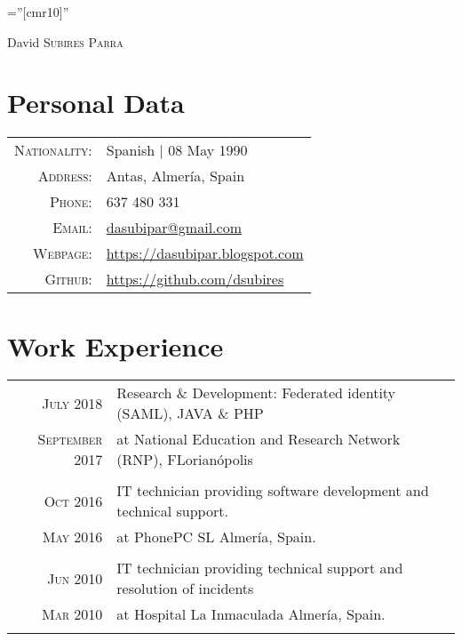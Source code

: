 \documentclass[a4paper,10pt]{article}
\begin{document}
\pagestyle{empty} %

\font\fb=''[cmr10]'' %

\par{\centering
		{\Huge David \textsc{Subires Parra}
	}\bigskip\par}

\section*{Personal Data}

\begin{tabular}{rp{12cm}}
    \textsc{Nationality:} & Spanish | 08 May 1990 \\
    \textsc{Address:}     & Antas, Almería, Spain \\
    \textsc{Phone:}       & 637 480 331 \\
    \textsc{Email:}       & \href {mailto:dasubipar@gmail.com}{dasubipar@gmail.com} \\
  \textsc{Webpage:}     & \url {https://dasubipar.blogspot.com} \\
    \textsc{Github:}      & \url{https://github.com/dsubires}
\end{tabular}

\section*{Work Experience}
\begin{tabular}{r|p{11cm}}


\textsc{July 2018} & Research \& Development: Federated identity (SAML), JAVA \& PHP
\\\textsc{September 2017} &  at National Education and Research Network (RNP), FLorianópolis  \normalsize \\\multicolumn{2}{c}{} \\



\textsc{Oct} 2016 & IT technician providing software development and technical support.\\\textsc{May 2016} & at PhonePC SL Almería, Spain. \normalsize \\\multicolumn{2}{c}{} \\


\textsc{Jun} 2010 & IT technician providing technical support and resolution of incidents\\\textsc{Mar 2010} & at Hospital La Inmaculada Almería, Spain. \normalsize \\\multicolumn{2}{c}{} \\


\end{tabular}
\end{document}
